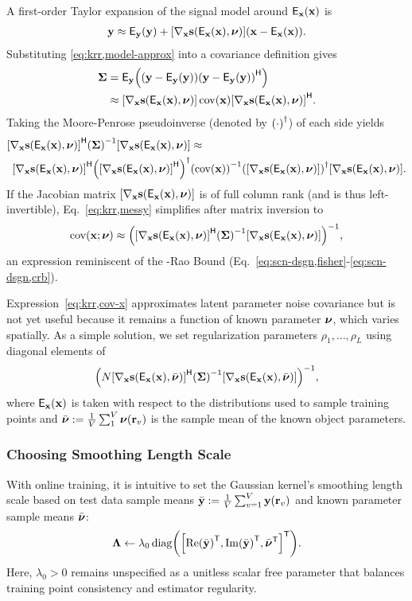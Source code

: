A first-order Taylor expansion
of the signal model 
around $\expect{\bmx}{\bmx}$ is
\begin{align}
	\bmy \approx \expect{\bmy}{\bmy} + 
		\gradxs \paren{\bmx - \expect{\bmx}{\bmx}}.
	\label{eq:krr,model-approx}
\end{align}
Substituting \eqref{eq:krr,model-approx}
into a covariance definition gives
\begin{align}
	\bmSig &= 
		\expect{\bmy}{
			\paren{\bmy - \expect{\bmy}{\bmy}}
			\paren{\bmy - \expect{\bmy}{\bmy}}\ctpose
		}
		\nonumber \\
		&\approx \gradxs \cov{\bmx} \gradxs\ctpose.
		\label{eq:krr,cov-y}
\end{align}
Taking the Moore-Penrose pseudoinverse 
(denoted by $\pinv{\cdot}$)
of each side yields 
\begin{align}
	\gradxs\ctpose \inv{\bmSig} \gradxs &\approx 
		\label{eq:krr,messy} \\
	\gradxs\ctpose \pinv{\gradxs\ctpose} &\inv{\cov{\bmx}} \pinv{\gradxs} \gradxs.
		\nonumber
\end{align}
If the Jacobian matrix $\gradxs$ 
is of full column rank
(and is thus left-invertible), 
Eq.~\eqref{eq:krr,messy} simplifies
after matrix inversion to
\begin{align}
	\cov{\bmx; \bmnu} \approx \inv{\gradxs\ctpose \inv{\bmSig} \gradxs},
	\label{eq:krr,cov-x}
\end{align}
an expression reminiscent
of the \Cramer-Rao Bound 
(\cf Eq.~\eqref{eq:scn-dsgn,fisher}-\eqref{eq:scn-dsgn,crb}).

Expression~\eqref{eq:krr,cov-x} approximates
latent parameter noise covariance 
but is not yet useful
because it remains a function 
of known parameter $\boldsymbol{\nu}$,
which varies spatially.
As a simple solution,
we set regularization parameters $\rho_1,\dots,\rho_L$
using diagonal elements of
$$\inv{N \gradxvs\ctpose \inv{\bmSig} \gradxvs},$$
where $\expx$ is taken
with respect to 
the distributions 
used to sample training points 
and $\nubar := \frac{1}{V} \sum_1^V \bmnu\paren{\bmr_v}$
is the sample mean 
of the known object parameters.

\subsubsection{Choosing Smoothing Length Scale}
\label{sss,krr,pract,mod,lam}

With online training,
it is intuitive
to set the Gaussian kernel's 
smoothing length scale 
based on test data sample means
$\bar{\bmy} := \frac{1}{V} \sum_{v=1}^V \bmy\paren{\bmr_v}$
and known parameter sample means $\bar{\boldsymbol{\nu}}$:
\begin{align}
	\bmL \gets \lambda_0 
	\diag{\brac{\re{\bar{\bmy}}\tpose, \im{\bar{\bmy}}\tpose, \nubar\tpose}\tpose}.
	\label{eq:krr,length}
\end{align}
Here, $\lambda_0>0$ remains unspecified
as a unitless scalar free parameter
that balances training point consistency 
and estimator regularity.

